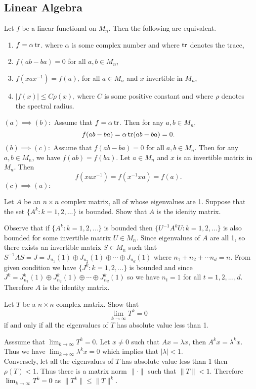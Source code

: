 \subsection{Linear Algebra}
    \question Let $f$ be a linear functional on $M_n$. Then the following are equivalent.
\begin{enumerate}
    \item $f=\alpha\operatorname{tr}$. where $\alpha$ is some complex number and where $\operatorname{tr}$ denotes the trace,
    \item $f(ab-ba)=0$ for all $a,b\in M_n$,
    \item $f(xax^{-1})=f(a)$, for all $a\in M_n$ and $x$ invertible in $M_n$,
    \item $|f(x)|\leq C\rho(x)$, where $C$ is some positive constant and where $\rho$ denotes the spectral radius.
\end{enumerate}

\begin{solution}
    $(a)\implies(b):$ Assume that $f=\alpha\operatorname{tr}$. Then for any $a,b\in M_n$, $$f(ab-ba)=\alpha\operatorname{tr}(ab-ba)=0.$$
    $(b)\implies(c):$ Assume that $f(ab-ba)=0$ for all $a,b\in M_n$. Then for any $a,b\in M_n$, we have $f(ab)=f(ba)$. Let $a\in M_n$ and $x$ is an invertible matrix in $M_n$. Then $$f(xax^{-1})=f(x^{-1}xa)=f(a).$$
    $(c)\implies(a):$
\end{solution}

\question Let $A$ be an $n\times n$ complex matrix, all of whose eigenvalues are 1. Suppose that the set $\{A^k : k = 1, 2, \ldots\}$ is bounded. Show that $A$ is the idenity matrix.

\begin{solution}
    Observe that if $\{A^k : k = 1, 2, \ldots\}$ is bounded then $\{U^{-1}A^kU : k = 1, 2, \ldots\}$ is also bounded for some invertible matrix $U\in M_n$. Since eigenvalues of $A$ are all 1, so there exists an invertible matrix $S\in M_n$ such that $S^{-1}AS=J=J_{n_1}(1)\oplus J_{n_2}(1)\oplus\cdots\oplus J_{n_d}(1)$ where $n_1+n_2+\cdots n_d=n$. From given condition we have $\{J^k : k = 1, 2, \ldots\}$ is bounded and since $J^k=J_{n_1}^k(1)\oplus J_{n_2}^k(1)\oplus\cdots\oplus J_{n_d}^k(1)$ so we have $n_t=1$ for all $t=1, 2, \ldots, d$. Therefore $A$ is the identity matrix.
\end{solution}

\question Let $T$ be a $n\times n$ complex matrix. Show that $$\lim_{k\to\infty}{T^k}=0$$ if and only if all the eigenvalues of $T$ has absolute value less than 1.

\begin{solution}
    Asssume that $\displaystyle\lim_{k\to\infty}{T^k}=0$. Let $x\neq 0$ such that $Ax=\lambda x$, then $A^kx=\lambda^k x$. Thus we have $\displaystyle\lim_{k\to\infty}{\lambda^kx}=0$ which implies that $|\lambda|<1$.\\
    Conversely, let all the eigenvalues of $T$ has absolute value less than 1 then $\rho(T)<1$. Thus there is a matrix norm $\|\cdot\|$ such that $\|T\|<1$. Therefore $\displaystyle\lim_{k\to\infty}{T^k}=0$ as $\|T^k\|\leq\|T\|^k$.
\end{solution}

